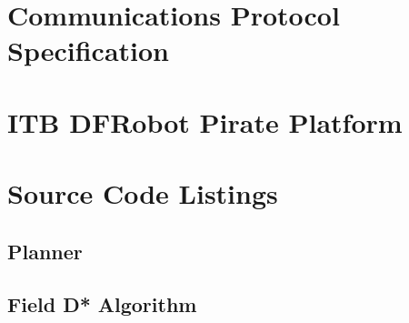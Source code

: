 \appendix
{}

\section{Communications Protocol Specification}
\label{Appendix: Communications Protocol Specification} 

\newpage

\section{ITB DFRobot Pirate Platform}
\label{Appendix: ITB DFRobot Pirate Platform}

\newpage

\section{Source Code Listings}
\label{Appendix: Source Code Listings}

\subsection{Planner}
\label{Appendix: Planner}

\subsection{Field D* Algorithm}
\label{Appendix: Field D* Algorithm}
